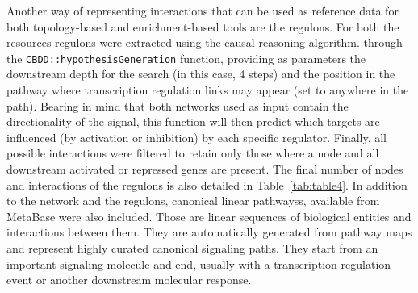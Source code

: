 Another way of representing interactions that can be used as reference data for both topology-based and enrichment-based tools are the regulons. For both the resources regulons were extracted using the causal reasoning algorithm. through the \texttt{\gls{CBDD}::hypothesisGeneration} function, providing as parameters the downstream depth for the search (in this case, 4 steps) and the position in the pathway where transcription regulation links may appear (set to anywhere in the path). 
Bearing in mind that both networks used as input contain the directionality of the signal, this function will then predict which targets are influenced (by activation or inhibition) by each specific regulator. 
Finally, all possible interactions were filtered to retain only those where a node and all downstream activated or repressed genes are present. The final number of nodes and interactions of the regulons is also detailed in Table~\ref{tab:table4}. 
In addition to the network and the regulons, canonical linear pathwayss, available from MetaBase were also included. Those are linear sequences of biological entities and interactions between them. They are automatically generated from pathway maps and represent highly curated canonical signaling paths. 
They start from an important signaling molecule and end, usually with a transcription regulation event or another downstream molecular response.

